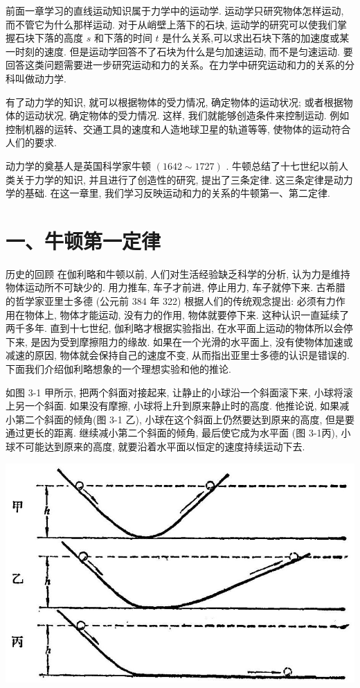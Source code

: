 \documentclass[10pt]{article}
\begin{document}
前面一章学习的直线运动知识属于力学中的运动学. 运动学只研究物体怎样运动, 而不管它为什么那样运动. 对于从峭壁上落下的石块, 运动学的研究可以使我们掌握石块下落的高度 \(s\) 和下落的时间 \(t\) 是什么关系,可以求出石块下落的加速度或某一时刻的速度. 但是运动学回答不了石块为什么是匀加速运动, 而不是匀速运动. 要回答这类问题需要进一步研究运动和力的关系。在力学中研究运动和力的关系的分科叫做动力学.

有了动力学的知识, 就可以根据物体的受力情况, 确定物体的运动状况; 或者根据物体的运动状况, 确定物体的受力情况. 这样, 我们就能够创造条件来控制运动. 例如控制机器的运转、交通工具的速度和人造地球卫星的轨道等等, 使物体的运动符合人们的要求.

动力学的奠基人是英国科学家牛顿 \(\left( {{1642} \sim {1727}}\right)\) . 牛顿总结了十七世纪以前人类关于力学的知识, 并且进行了创造性的研究, 提出了三条定律. 这三条定律是动力学的基础. 在这一章里, 我们学习反映运动和力的关系的牛顿第一、第二定律.

\section*{一、牛顿第一定律}

历史的回顾 在伽利略和牛顿以前, 人们对生活经验缺乏科学的分析, 认为力是维持物体运动所不可缺少的. 用力推车, 车子才前进, 停止用力, 车子就停下来. 古希腊的哲学家亚里士多德 (公元前 384 年 322) 根据人们的传统观念提出: 必须有力作用在物体上, 物体才能运动, 没有力的作用, 物体就要停下来. 这种认识一直延续了两千多年. 直到十七世纪, 伽利略才根据实验指出, 在水平面上运动的物体所以会停下来, 是因为受到摩擦阻力的缘故. 如果在一个光滑的水平面上, 没有使物体加速或减速的原因, 物体就会保持自己的速度不变, 从而指出亚里士多德的认识是错误的. 下面我们介绍伽利略想象的一个理想实验和他的推论.

如图 3-1 甲所示, 把两个斜面对接起来, 让静止的小球沿一个斜面滚下来, 小球将滚上另一个斜面. 如果没有摩擦, 小球将上升到原来静止时的高度. 他推论说, 如果减小第二个斜面的倾角(图 3-1 乙), 小球在这个斜面上仍然要达到原来的高度, 但是要通过更长的距离. 继续减小第二个斜面的倾角, 最后使它成为水平面 (图 3-1丙), 小球不可能达到原来的高度, 就要沿着水平面以恒定的速度持续运动下去.

\begin{center}
\includegraphics[max width=1.0\textwidth]{images/01912d55-147c-70aa-b0e0-1782a122f948_91_758500.jpg}
\end{center}
\end{document}

